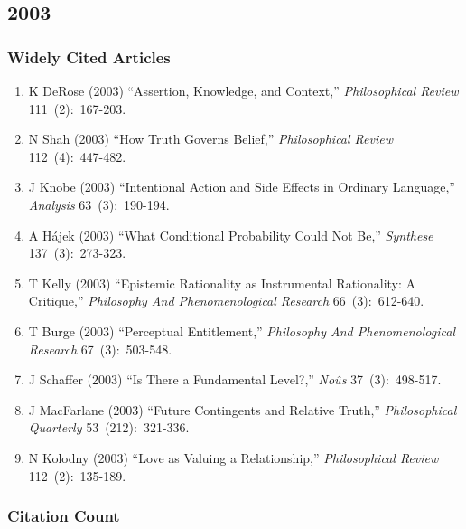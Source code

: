 \documentclass[
  10pt,
  letterpaper,
  DIV=11,
  numbers=noendperiod,
  twoside]{scrartcl}
\providecommand{\tightlist}{%
  \setlength{\itemsep}{0pt}\setlength{\parskip}{0pt}}\usepackage{longtable,booktabs,array}
\begin{document}
\newpage

\subsection{2003}\label{sec-s2003}

\subsubsection*{Widely Cited Articles}\label{widely-cited-articles-46}

\begin{enumerate}
\def\labelenumi{\arabic{enumi}.}
\tightlist
\item
  K DeRose (2003) ``Assertion, Knowledge, and Context,''
  \emph{Philosophical Review} 111~(2):~167-203.
\item
  N Shah (2003) ``How Truth Governs Belief,'' \emph{Philosophical
  Review} 112~(4):~447-482.
\item
  J Knobe (2003) ``Intentional Action and Side Effects in Ordinary
  Language,'' \emph{Analysis} 63~(3):~190-194.
\item
  A Hájek (2003) ``What Conditional Probability Could Not Be,''
  \emph{Synthese} 137~(3):~273-323.
\item
  T Kelly (2003) ``Epistemic Rationality as Instrumental Rationality: A
  Critique,'' \emph{Philosophy And Phenomenological Research}
  66~(3):~612-640.
\item
  T Burge (2003) ``Perceptual Entitlement,'' \emph{Philosophy And
  Phenomenological Research} 67~(3):~503-548.
\item
  J Schaffer (2003) ``Is There a Fundamental Level?,'' \emph{Noûs}
  37~(3):~498-517.
\item
  J MacFarlane (2003) ``Future Contingents and Relative Truth,''
  \emph{Philosophical Quarterly} 53~(212):~321-336.
\item
  N Kolodny (2003) ``Love as Valuing a Relationship,''
  \emph{Philosophical Review} 112~(2):~135-189.
\end{enumerate}

\subsubsection*{Citation Count}\label{sec-count-2003}
\end{document}
